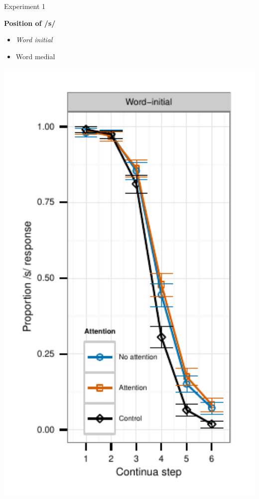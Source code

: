 \documentclass{beamer}
\begin{document}
\begin{frame}{Experiment 1}
\begin{minipage}{0.45\textwidth}
\textbf{Position of /s/}
\begin{itemize}
\item \emph{Word initial}
\item Word medial
\end{itemize}
\end{minipage}
\hfill
\begin{minipage}{0.4\textwidth}
\includegraphics[width=1.0\textwidth]{graphs/exp1_categresults_present2-initial}
\end{minipage}

\end{frame}
\end{document}
